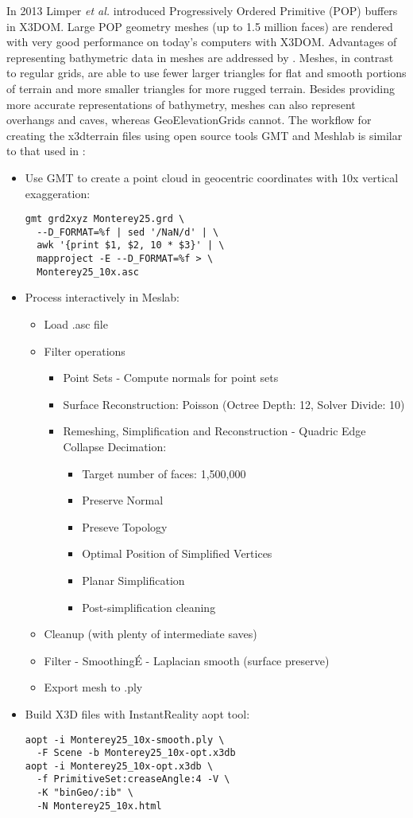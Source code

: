 \documentclass[conference]{IEEEtran}
\begin{document}
In 2013 Limper \textit{et al.} \cite{Limper:2013:FDW:2466533.2466536} introduced Progressively Ordered Primitive (POP) buffers in X3DOM. Large POP geometry meshes (up to 1.5 million faces) are rendered with very good performance on today's computers with X3DOM. Advantages of representing bathymetric data in meshes are addressed by \cite{Becker:2005:NPN:1650409.1650513}. Meshes, in contrast to regular grids, are able to use fewer larger triangles for flat and smooth portions of terrain and more smaller triangles for more rugged terrain. Besides providing more accurate representations of bathymetry, meshes can also represent overhangs and caves, whereas GeoElevationGrids cannot. The workflow for creating the x3dterrain files using open source tools GMT \cite{GMT} and Meshlab \cite{Meshlab} is similar to that used in \cite{Silvestre}:

\begin{itemize}
\item Use GMT to create a point cloud in geocentric coordinates with 10x vertical exaggeration:
\begin{verbatim}
gmt grd2xyz Monterey25.grd \
  --D_FORMAT=%f | sed '/NaN/d' | \
  awk '{print $1, $2, 10 * $3}' | \ 
  mapproject -E --D_FORMAT=%f > \
  Monterey25_10x.asc
\end{verbatim}
\item Process interactively in Meslab:
\begin{itemize}
\item Load .asc file
\item Filter operations
\begin{itemize}
\item Point Sets - Compute normals for point sets
\item Surface Reconstruction: Poisson (Octree Depth: 12, Solver Divide: 10)
\item Remeshing, Simplification and Reconstruction - Quadric Edge Collapse Decimation:
\begin{itemize}
\item Target number of faces: 1,500,000
\item Preserve Normal
\item Preseve Topology
\item Optimal Position of Simplified Vertices
\item Planar Simplification
\item Post-simplification cleaning
\end{itemize}
\end{itemize}
\item Cleanup (with plenty of intermediate saves)
\item Filter - SmoothingÉ - Laplacian smooth (surface preserve)
\item Export mesh to .ply
\end{itemize}
\item Build X3D files with InstantReality aopt tool:
\begin{verbatim}
aopt -i Monterey25_10x-smooth.ply \
  -F Scene -b Monterey25_10x-opt.x3db
aopt -i Monterey25_10x-opt.x3db \
  -f PrimitiveSet:creaseAngle:4 -V \
  -K "binGeo/:ib" \
  -N Monterey25_10x.html
\end{verbatim}
\end{itemize}
\end{document}
